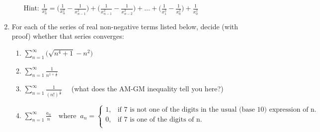 \documentclass[11pt]{article}
\begin{document}
\begin{enumerate}[leftmargin=0pt, label=\arabic*)]
\begin{enumerate}[label=(\roman*)]
         Hint: \(\frac{1}{x_n^2} = \Big(\frac{1}{x_n^2} - \frac{1}{x_{n-1}^2}\Big) + \Big(\frac{1}{x_{n-1}^2} - 
         \frac{1}{x_{n-2}^2}\Big) + \dots + \Big(\frac{1}{x_1^2} - \frac{1}{x_0^2}\Big) + \frac{1}{x_0^2}\)
     \end{enumerate}
     \newpage
     
   \item For each of the series of real non-negative terms listed below, decide (with proof) whether that series converges:
   \begin{enumerate}
     \item \(\displaystyle\sum_{n=1}^{\infty} \Big(\sqrt{n^4 + 1} - n^2\Big)\)

     \item \(\displaystyle\sum_{n=1}^{\infty} \frac{1}{n^{1+\frac{1}{n}}}\)

     \item \(\displaystyle\sum_{n=1}^{\infty} \frac{1}{(n!)^{\frac{1}{n}}} \quad\) (what does the AM-GM inequality tell you here?)

     \item \(\displaystyle\sum_{n=1}^{\infty} \frac{a_n}{n} \quad \text{where} \;\; a_n = \begin{cases}
       1, & \text{if 7 is not one of the digits in the usual (base 10) expression of n.} \\
       0, & \text{if 7 is one of the digits of n.} \\
     \end{cases}\)
   \end{enumerate}
 \end{enumerate}
\end{document}
